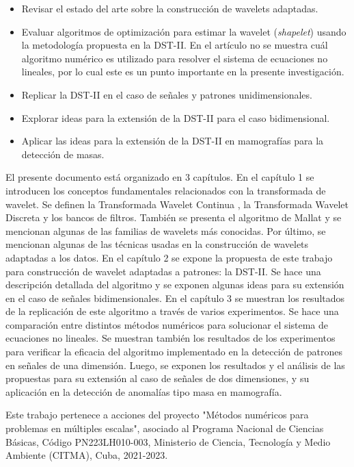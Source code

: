 \begin{itemize}
	\item Revisar el estado del arte sobre la construcción de wavelets adaptadas.
	\item Evaluar algoritmos de optimización para estimar la wavelet (\textit{shapelet})
		usando la metodología propuesta en la DST-II. En el artículo \cite{Guido2018} no se muestra
		cuál algoritmo numérico es utilizado para resolver el sistema de ecuaciones no lineales, 
		por lo cual este es un punto importante en la presente investigación.
	\item Replicar la DST-II en el caso de señales y patrones unidimensionales. 
	\item Explorar ideas para la extensión de la DST-II para el caso bidimensional. 
	\item Aplicar las ideas para la extensión de la DST-II en mamografías para la detección de masas.  
\end{itemize}

El presente documento está organizado en 3 capítulos.
En el capítulo 1 se introducen los conceptos fundamentales relacionados con la transformada de wavelet. Se definen
la Transformada Wavelet Continua , la Transformada Wavelet Discreta y los bancos de filtros.
También se presenta el algoritmo de Mallat y se mencionan algunas de las familias de wavelets más conocidas.
Por último, se mencionan algunas de las técnicas usadas en la construcción de wavelets adaptadas a los datos. 
En el capítulo 2 se expone la propuesta de este trabajo para construcción de wavelet adaptadas a patrones: 
la DST-II. Se hace una descripción detallada del algoritmo y se exponen algunas ideas para su extensión en el
caso de señales bidimensionales.
En el capítulo 3 se muestran los resultados de la replicación de este algoritmo a través de varios experimentos.
Se hace una comparación entre distintos métodos numéricos para solucionar el sistema de ecuaciones
no lineales. Se muestran también los resultados de los experimentos para verificar la eficacia del algoritmo implementado en  
la detección de patrones en señales de una dimensión. Luego, se exponen  los resultados y el análisis de las propuestas
para su extensión al caso de señales de dos dimensiones, y su aplicación en la detección de anomalías tipo masa en mamografía.

Este trabajo pertenece a acciones del proyecto "Métodos numéricos para problemas en múltiples escalas", asociado al Programa Nacional de Ciencias Básicas, Código PN223LH010-003, Ministerio de Ciencia, Tecnología y Medio Ambiente (CITMA), Cuba, 2021-2023.
